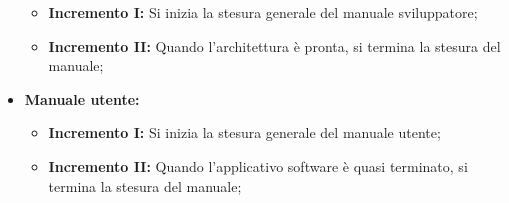 \documentclass[../piano_di_progetto.tex]{subfiles}
\begin{document}
\begin{itemize}
        \begin{itemize}
            \item \textbf{Incremento I:} Si inizia la stesura generale del manuale sviluppatore;
            \item \textbf{Incremento II:} Quando l'architettura è pronta, si termina la stesura del manuale;
        \end{itemize}
        \item \textbf{Manuale utente:}
        \begin{itemize}
            \item \textbf{Incremento I:} Si inizia la stesura generale del manuale utente;
            \item \textbf{Incremento II:} Quando l'applicativo software è quasi terminato, si termina la stesura del manuale;
        \end{itemize}
\end{itemize}
\end{document}
